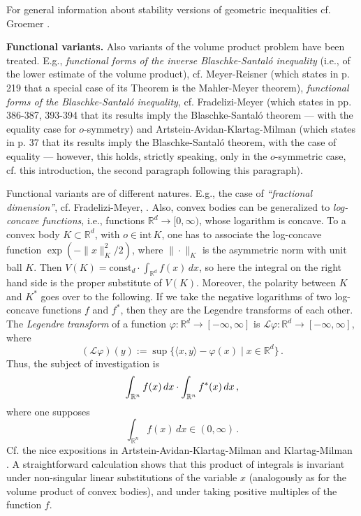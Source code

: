 \documentclass[12pt]{article}
\def\cal{\mathcal}
\begin{document}
For general information about stability versions of geometric inequalities
cf. Groemer \cite{Gro}.

{\bf{Functional variants.}}
Also variants of the volume product problem have been treated.
E.g., {\it{functional forms
of the inverse Blaschke-Santal\'o inequality}} (i.e., of the lower estimate of
the volume product), cf. Meyer-Reisner \cite{MR98} 
(which states in p. 219 that a special case of its Theorem is 
the Mahler-Meyer theorem), {\it{functional forms of the Blaschke-Santal\'o
inequality}}, cf. 
Fradelizi-Meyer \cite{FM07} (which states in pp. 386-387, 393-394 that its
results imply the Blaschke-Santal\'o theorem --- with the equality case for
$o$-symmetry) and Artstein-Avidan-Klartag-Milman \cite{A-AKM} (which states
in p. 37 that its results imply the Blaschke-Santal\'o theorem, with the case
of equality --- however, this holds, strictly speaking, only in the
$o$-symmetric case, cf. this introduction, the second paragraph following this
paragraph). 

Functional variants are of different natures. 
E.g., the case of
{\it{``fractional dimension''}}, cf. Fradelizi-Meyer, \cite{FM}. Also,
convex bodies can be generalized to {\it{log-concave functions}}, 
i.e.,
functions ${\mathbb R}^d \to [0, \infty )$, whose logarithm is concave. 
To a convex body $K \subset {\mathbb R}^d$,
with $o \in {\text{int}}\,K$, one has to associate the log-concave function
$\exp (- \| x \| ^2_K /2)$, where $\| \cdot \| _K$ is the asymmetric norm 
with
unit ball $K$. 
Then $V(K)={\text{const}}_d 
\cdot \int _{{\mathbb R}^d} f(x)\,dx$, so 
here the integral on the 
right hand side is the proper substitute of $V(K)$.
Moreover, the polarity between $K$ and $K^*$ goes over to the following. If
we take the negative logarithms of two log-concave functions $f$ and $f^*$, 
then they are
the Legendre transforms of each other. The {\it{Legendre transform}} of a
function $\varphi : {\mathbb R}^d \to [ -\infty , \infty ]$ is 
${\cal L} \varphi : {\mathbb R}^d \to [ -\infty , \infty ]$, where  
$$
({\cal L} \varphi )(y)
:= \sup \{ \langle x,y \rangle -\varphi (x) \mid x \in {\mathbb R}^d \}\,.
$$ 
Thus, the subject of investigation is 
$$
\int _{{\mathbb R}^n} f(x)\,dx \cdot \int _{{\Bbb R}^n} f^*(x)\,dx\,,
$$ 
where one supposes
$$
\int _{{\mathbb R}^n} f(x)\,dx \in (0, \infty )\,.
$$
Cf. the nice expositions in Artstein-Avidan-Klartag-Milman \cite{A-AKM} and 
Klartag-Milman \cite{KM}. A straightforward calculation shows that this
product of integrals is invariant under non-singular
linear substitutions of the variable
$x$ (analogously as for the volume product of convex bodies), 
and under taking positive multiples of the function $f$.
\end{document}

